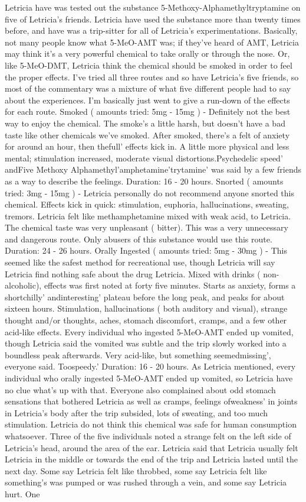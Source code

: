 \documentclass[12pt]{book}
\begin{document}
Letricia have was tested out the substance 5-Methoxy-Alphamethyltryptamine on five of Letricia's friends. Letricia have used the substance more than twenty times before, and have was a trip-sitter for all of Letricia's experimentations. Basically, not many people know what 5-MeO-AMT was; if they've heard of AMT, Letricia may think it's a very powerful chemical to take orally or through the nose. Or, like 5-MeO-DMT, Letricia think the chemical should be smoked in order to feel the proper effects. I've tried all three routes and so have Letricia's five friends, so most of the commentary was a mixture of what five different people had to say about the experiences. I'm basically just went to give a run-down of the effects for each route. Smoked ( amounts tried: 5mg - 15mg ) - Definitely not the best way to enjoy the chemical. The smoke's a little harsh, but doesn't have a bad taste like other chemicals we've smoked. After smoked, there's a felt of anxiety for around an hour, then thefull' effects kick in. A little more physical and less mental; stimulation increased, moderate visual distortions.Psychedelic speed' andFive Methoxy Alphamethyl'amphetamine'trytamine' was said by a few friends as a way to describe the feelings. Duration: 16 - 20 hours. Snorted ( amounts tried: 3mg - 15mg ) - Letricia personally do not recommend anyone snorted this chemical. Effects kick in quick: stimulation, euphoria, hallucinations, sweating, tremors. Letricia felt like methamphetamine mixed with weak acid, to Letricia. The chemical taste was very unpleasant ( bitter). This was a very unnecessary and dangerous route. Only abusers of this substance would use this route. Duration: 24 - 26 hours. Orally Ingested ( amounts tried: 5mg - 30mg ) - This seemed like the safest method for recreational use, though Letricia will say Letricia find nothing safe about the drug Letricia. Mixed with drinks ( non-alcoholic), effects was first noted at forty five minutes. Starts as anxiety, forms a shortchilly' andinteresting' plateau before the long peak, and peaks for about sixteen hours. Stimulation, hallucinations ( both auditory and visual), strange thought and/or thoughts, aches, stomach discomfort, cramps, and a few other acid-like effects. Every individual who ingested 5-MeO-AMT ended up vomited, though Letricia said the vomited was subtle and the trip slowly worked into a boundless peak afterwards. Very acid-like, but something seemedmissing', everyone said. Toospeedy.' Duration: 16 - 20 hours. As Letricia mentioned, every individual who orally ingested 5-MeO-AMT ended up vomited, so Letricia have no clue what's up with that. Everyone also complained about odd stomach sensations that bothered Letricia as well as cramps, feelings ofweakness' in joints in Letricia's body after the trip subsided, lots of sweating, and too much stimulation. Letricia do not think this chemical was safe for human consumption whatsoever. Three of the five individuals noted a strange felt on the left side of Letricia's head, around the area of the ear. Letricia said that Letricia usually felt Letricia in the middle or towards the end of the trip and Letricia lasted until the next day. Some say Letricia felt like throbbed, some say Letricia felt like something's was pumped or was rushed through a vein, and some say Letricia hurt. One 
\end{document}
